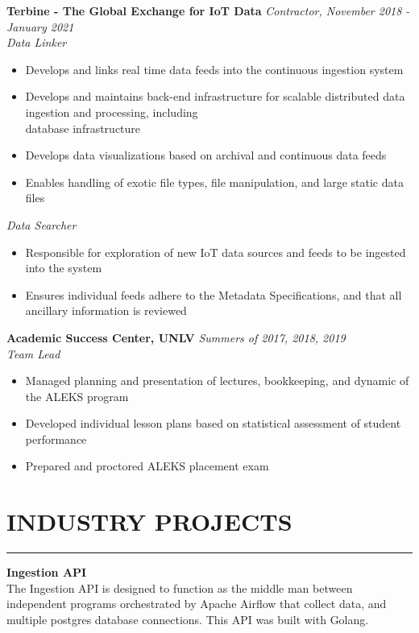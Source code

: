 \documentclass{res}
\begin{document}
\begin{resume}
		{\bf Terbine - The Global Exchange for IoT Data} \hfill \emph{Contractor, November 2018 - January 2021} \\
			\emph{Data Linker}

			\begin{itemize} \itemsep -2pt
				\item Develops and links real time data feeds into the continuous ingestion system
				\item Develops and maintains back-end infrastructure for scalable distributed data ingestion and processing, including \  \\
        database infrastructure
				\item Develops data visualizations based on archival and continuous data feeds
				\item Enables handling of exotic file types, file manipulation, and large static data files
			\end{itemize} \vspace{-2mm}

			\emph{Data Searcher}

			\begin{itemize} \itemsep -2pt
				\item Responsible for exploration of new IoT data sources and feeds to be ingested into the system
				\item Ensures individual feeds adhere to the Metadata Specifications, and that all ancillary information is reviewed
			\end{itemize} \vspace{-2mm}

		{\bf Academic Success Center, UNLV} \hfill \emph{Summers of 2017, 2018, 2019} \\
			\emph{Team Lead}

			\begin{itemize} \itemsep -2pt
				\item Managed planning and presentation of lectures, bookkeeping, and dynamic of the ALEKS program
				\item Developed individual lesson plans based on statistical assessment of student performance
        \item Prepared and proctored ALEKS placement exam
			\end{itemize}

\vspace{-3pt}

		\section{{INDUSTRY PROJECTS}}
    \noindent\rule[0.5ex]{\linewidth}{1pt}
		{\bf Ingestion API} \hfill \vspace{5pt} \\
			The Ingestion API is designed to function as the middle man between independent programs orchestrated by Apache Airflow that collect data, and multiple postgres database connections. This API was built with Golang.
\vspace{-5pt}


\end{resume}
\end{document}
